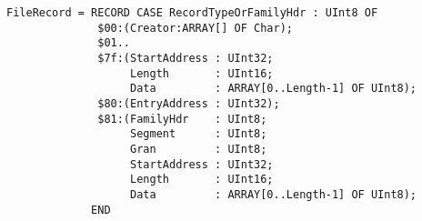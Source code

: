 \begin{verbatim}
FileRecord = RECORD CASE RecordTypeOrFamilyHdr : UInt8 OF
              $00:(Creator:ARRAY[] OF Char);
              $01..
              $7f:(StartAddress : UInt32;
                   Length       : UInt16;
                   Data         : ARRAY[0..Length-1] OF UInt8);
              $80:(EntryAddress : UInt32);
              $81:(FamilyHdr    : UInt8;
                   Segment      : UInt8;
                   Gran         : UInt8;
                   StartAddress : UInt32;
                   Length       : UInt16;
                   Data         : ARRAY[0..Length-1] OF UInt8);
             END
\end{verbatim}
